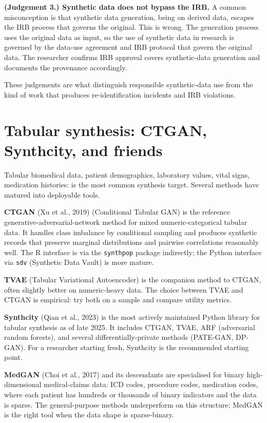 \documentclass[
  letterpaper,
  11pt]{scrbook}
\begin{document}
\textbf{(Judgement 3.) Synthetic data does not bypass the IRB.} A common
misconception is that synthetic data generation, being on derived data,
escapes the IRB process that governs the original. This is wrong. The
generation process uses the original data as input, so the use of
synthetic data in research is governed by the data-use agreement and IRB
protocol that govern the original data. The researcher confirms IRB
approval covers synthetic-data generation and documents the provenance
accordingly.

These judgements are what distinguish responsible synthetic-data use
from the kind of work that produces re-identification incidents and IRB
violations.

\section{Tabular synthesis: CTGAN, Synthcity, and
friends}\label{tabular-synthesis-ctgan-synthcity-and-friends}

Tabular biomedical data, patient demographics, laboratory values, vital
signs, medication histories: is the most common synthesis target.
Several methods have matured into deployable tools.

\textbf{CTGAN} (Xu et al., 2019) (Conditional Tabular GAN) is the
reference generative-adversarial-network method for mixed
numeric-categorical tabular data. It handles class imbalance by
conditional sampling and produces synthetic records that preserve
marginal distributions and pairwise correlations reasonably well. The R
interface is via the \texttt{synthpop} package indirectly; the Python
interface via \texttt{sdv} (Synthetic Data Vault) is more mature.

\textbf{TVAE} (Tabular Variational Autoencoder) is the companion method
to CTGAN, often slightly better on numeric-heavy data. The choice
between TVAE and CTGAN is empirical: try both on a sample and compare
utility metrics.

\textbf{Synthcity} (Qian et al., 2023) is the most actively maintained
Python library for tabular synthesis as of late 2025. It includes CTGAN,
TVAE, ARF (adversarial random forests), and several
differentially-private methods (PATE-GAN, DP-GAN). For a researcher
starting fresh, Synthcity is the recommended starting point.

\textbf{MedGAN} (Choi et al., 2017) and its descendants are specialised
for binary high-dimensional medical-claims data: ICD codes, procedure
codes, medication codes, where each patient has hundreds or thousands of
binary indicators and the data is sparse. The general-purpose methods
underperform on this structure; MedGAN is the right tool when the data
shape is sparse-binary.
\end{document}
